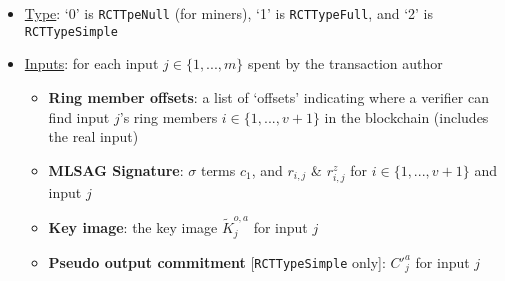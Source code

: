 \begin{itemize}
    \item \underline{Type}: `0' is {\tt RCTTpeNull} (for miners), `1' is {\tt RCTTypeFull}, and `2' is {\tt RCTTypeSimple} %
    \item \underline{Inputs}: for each input $j \in \{1,...,m\}$ spent by the transaction author
    \begin{itemize}
        \item \textbf{Ring member offsets}: a list of `offsets' indicating where a verifier can find input $j$'s ring members $i \in \{1,...,v+1\}$ in the blockchain (includes the real input)
        \item \textbf{MLSAG Signature}: $\sigma$ terms $c_1$, and $r_{i,j}$ \& $r^{z}_{i,j}$ for $i \in \{1,...,v+1\}$ and input $j$
        \item \textbf{Key image}: the key image $\tilde{K}^{o,a}_j$ for input $j$
        \item \textbf{Pseudo output commitment} {[{\tt RCTTypeSimple} only]}: $C'^{a}_j$ for input $j$
    \end{itemize}


\end{itemize}
